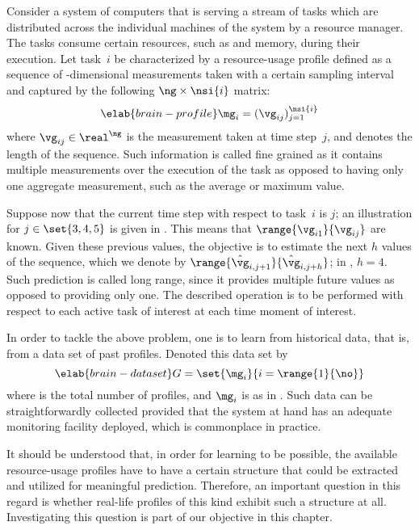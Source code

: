 Consider a system of computers that is serving a stream of tasks which are
distributed across the individual machines of the system by a resource manager.
The tasks consume certain resources, such as  and memory, during their
execution. Let task~$i$ be characterized by a resource-usage profile defined as
a sequence of \ng-dimensional measurements taken with a certain sampling
interval and captured by the following $\ng \times \nsi{i}$ matrix:
\begin{equation} \elab{brain-profile}
  \mg_i = (\vg_{ij})_{j = 1}^\nsi{i}
\end{equation}
where $\vg_{ij} \in \real^\ng$ is the measurement taken at time step~$j$, and
 denotes the length of the sequence. Such information is called fine
grained as it contains multiple measurements over the execution of the task as
opposed to having only one aggregate measurement, such as the average or maximum
value.

Suppose now that the current time step with respect to task~$i$ is $j$; an
illustration for $j \in \set{3, 4, 5}$ is given in .
This means that $\range{\vg_{i1}}{\vg_{ij}}$ are known. Given these previous
values, the objective is to estimate the next $h$ values of the sequence, which
we denote by $\range{\hat{\vg}_{i, j + 1}}{\hat{\vg}_{i, j + h}}$; in
, $h = 4$. Such prediction is called long range, since
it provides multiple future values as opposed to providing only one. The
described operation is to be performed with respect to each active task of
interest at each time moment of interest.

In order to tackle the above problem, one is to learn from historical data, that
is, from a data set of past profiles. Denoted this data set by
\begin{equation} \elab{brain-dataset}
  G = \set{\mg_i}{i = \range{1}{\no}}
\end{equation}
where \no is the total number of profiles, and $\mg_i$ is as in
. Such data can be straightforwardly collected provided that
the system at hand has an adequate monitoring facility deployed, which is
commonplace in practice.

It should be understood that, in order for learning to be possible, the
available resource-usage profiles have to have a certain structure that could be
extracted and utilized for meaningful prediction. Therefore, an important
question in this regard is whether real-life profiles of this kind exhibit such
a structure at all. Investigating this question is part of our objective in this
chapter.
